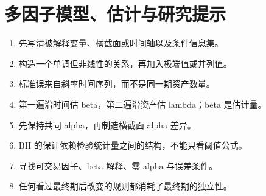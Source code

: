 \chapter{多因子模型、估计与研究提示}
\begin{enumerate}[leftmargin=*]
  \item 先写清被解释变量、横截面或时间轴以及条件信息集。
  \item 构造一个单调但非线性的关系，再加入极端值或并列值。
  \item 标准误来自斜率时间序列，而不是同一期资产数量。
  \item 第一遍沿时间估 beta，第二遍沿资产估 lambda；beta 是估计量。
  \item 先保持共同 alpha，再制造横截面 alpha 差异。
  \item BH 的保证依赖检验统计量之间的结构，不能只看阈值公式。
  \item 寻找可交易因子、beta 解释、零 alpha 与误差条件。
  \item 任何看过最终期后改变的规则都消耗了最终期的独立性。
\end{enumerate}
